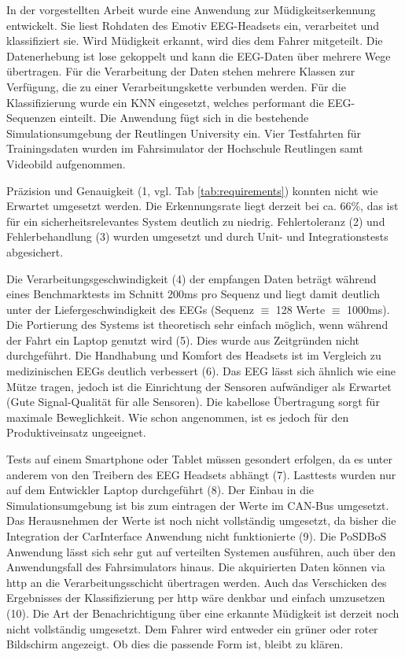 \label{chap:result}
In der vorgestellten Arbeit wurde eine Anwendung zur Müdigkeitserkennung entwickelt. Sie liest Rohdaten des Emotiv EEG-Headsets ein, verarbeitet und klassifiziert sie. Wird Müdigkeit erkannt, wird dies dem Fahrer mitgeteilt. 
Die Datenerhebung ist lose gekoppelt und kann die EEG-Daten über mehrere Wege übertragen. Für die Verarbeitung der Daten stehen mehrere Klassen zur Verfügung, die zu einer Verarbeitungskette verbunden werden. Für die Klassifizierung wurde ein KNN eingesetzt, welches performant die EEG-Sequenzen einteilt. Die Anwendung fügt sich in die bestehende Simulationsumgebung der Reutlingen University ein.
Vier Testfahrten für Trainingsdaten wurden im Fahrsimulator der Hochschule Reutlingen samt Videobild aufgenommen.

Präzision und Genauigkeit (1, vgl. Tab \ref{tab:requirements}) konnten nicht wie Erwartet umgesetzt werden. Die Erkennungsrate liegt derzeit bei ca. 66\%, das ist für ein sicherheitsrelevantes System deutlich zu niedrig. 
Fehlertoleranz (2) und Fehlerbehandlung (3) wurden umgesetzt und durch Unit- und Integrationstests abgesichert. 

Die Verarbeitungsgeschwindigkeit (4) der empfangen Daten beträgt  während eines Benchmarktests im Schnitt 200ms pro Sequenz und liegt damit deutlich unter der Liefergeschwindigkeit des EEGs (Sequenz $\equiv$ 128 Werte $\equiv$ 1000ms). 
Die Portierung des Systems ist theoretisch sehr einfach möglich, wenn während der Fahrt ein Laptop genutzt wird (5). Dies wurde aus Zeitgründen nicht durchgeführt. Die Handhabung und Komfort des Headsets ist im Vergleich zu medizinischen EEGs deutlich verbessert (6). Das EEG lässt sich ähnlich wie eine Mütze tragen, jedoch ist die Einrichtung der Sensoren aufwändiger als Erwartet (Gute Signal-Qualität für alle Sensoren). Die kabellose Übertragung sorgt für maximale Beweglichkeit. Wie schon angenommen, ist es jedoch für den Produktiveinsatz ungeeignet.

Tests auf einem Smartphone oder Tablet müssen gesondert erfolgen, da es unter anderem von den Treibern des EEG Headsets abhängt (7). Lasttests wurden nur auf dem Entwickler Laptop durchgeführt (8). Der Einbau in die Simulationsumgebung ist bis zum eintragen der Werte im CAN-Bus umgesetzt. Das Herausnehmen der Werte ist noch nicht vollständig umgesetzt, da bisher die Integration der CarInterface Anwendung nicht funktionierte (9). Die PoSDBoS Anwendung lässt sich sehr gut auf verteilten Systemen ausführen, auch über den Anwendungsfall des Fahrsimulators hinaus. Die akquirierten Daten können via http an die Verarbeitungsschicht übertragen werden. Auch das Verschicken des Ergebnisses der Klassifizierung per http wäre denkbar und einfach umzusetzen (10). Die Art der Benachrichtigung über eine erkannte Müdigkeit ist derzeit noch nicht vollständig umgesetzt. Dem Fahrer wird entweder ein grüner oder roter Bildschirm angezeigt. Ob dies die passende Form ist, bleibt zu klären.

